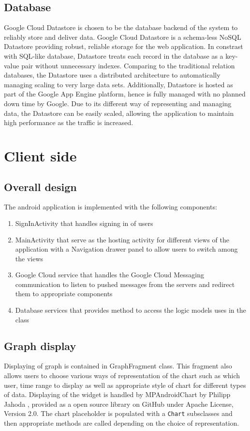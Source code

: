 \subsection{Database}
Google Cloud Datastore is chosen to be the database backend of the system to reliably store and deliver data. Google
Cloud Datastore is a schema-less NoSQL Datastore providing robust, reliable storage for the web application. In
constrast with SQL-like database, Datastore treats each record in the database as a key-value pair without unnecessary
indexes. Comparing to the traditional relation databases, the Datastore uses a distributed architecture to automatically
managing scaling to very large data sets. Additionally, Datastore is hosted as part of the Google App Engine platform,
hence is fully managed with no planned down time by Google. Due to its different way of representing and managing data,
the Datastore can be easily scaled, allowing the application to maintain high performance as the traffic is increased.

\section{Client side}
\subsection{Overall design}
The android application is implemented with the following components:
\begin{enumerate}
    \item SignInActivity that handles signing in of users
    \item MainActivity that serve as the hosting activity for different views of the application with a Navigation
        drawer panel to allow users to switch among the views
    \item Google Cloud service that handles the Google Cloud Messaging communication to listen to pushed messages from
        the servers and redirect them to appropriate components
    \item Database services that provides method to access the logic models uses in the class
\end{enumerate}

\subsection{Graph display}
Displaying of graph is contained in GraphFragment class. This fragment also allows users to choose various ways of
representation of the chart such as which user, time range to display as well as appropriate style of chart for
different types of data. Displaying of the widget is handled by MPAndroidChart by Philipp Jahoda \cite{MPAndroidChart},
provided as a open source library on GitHub under Apache License, Version 2.0. The chart placeholder is populated with a
\texttt{Chart} subsclasses and then appropriate methods are called depending on the choice of representation.

